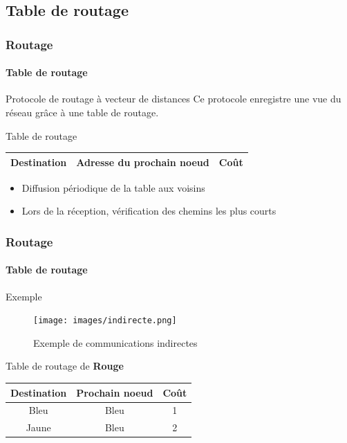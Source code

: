 \documentclass{beamer}
\begin{document}
    \subsection{Table de routage}
    \begin{frame}
      \frametitle{Routage}
      \framesubtitle{Table de routage}
      \begin{block}{Protocole de routage à vecteur de distances}
        Ce protocole enregistre une vue du réseau grâce à une table de routage.
      \end{block}
      \begin{block}{Table de routage}
        \begin{table}
          \begin{center}
            \begin{tabular}{|c|c|c|}
               \hline
               Destination & Adresse du prochain noeud & Coût \\
               \hline
            \end{tabular}
          \end{center}
          \begin{itemize}
            \item Diffusion périodique de la table aux voisins
            \item Lors de la réception, vérification des chemins les plus courts
          \end{itemize}
        \end{table}
      \end{block}
    \end{frame}
    \begin{frame}
      \frametitle{Routage}
      \framesubtitle{Table de routage}
      \begin{block}{Exemple}
        \begin{figure}
          \begin{center}
            \texttt{[image: images/indirecte.png]}
            \caption{Exemple de communications indirectes}
            \label{fig:indirecte}
          \end{center}
        \end{figure}
        \begin{center}
          Table de routage de \textbf{Rouge}
          \begin{small}
            \begin{table}
              \begin{tabular}{|c|c|c|}
                \hline
                \textbf{Destination} & \textbf{Prochain noeud} & \textbf{Coût} \\
                \hline
                Bleu & Bleu & 1 \\
                Jaune & Bleu & 2 \\
                \hline
              \end{tabular}
            \end{table}
          \end{small}
        \end{center}
      \end{block}
    \end{frame}
  
\end{document}
